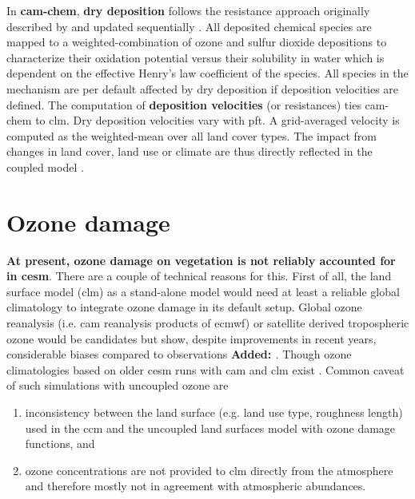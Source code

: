 In \textbf{\gls{cam}-chem}, \textbf{dry deposition} follows the resistance approach originally described by \textcites{AE:Wesely1989}{AE:Walcek1986} and updated sequentially \parencites{AE:Walmsley1996}{AE:Wesely2000}. All deposited chemical species are mapped to a weighted-combination of ozone and sulfur dioxide depositions to characterize their oxidation potential versus their solubility in water which is dependent on the effective Henry’s law coefficient of the species. All species in the mechanism are per default affected by dry deposition if deposition velocities are defined. The computation of \textbf{deposition velocities} (or resistances) ties \gls{cam}-chem to \gls{clm}. Dry deposition velocities vary with \gls{pft}. A grid-averaged velocity is computed as the weighted-mean over all land cover types. The impact from changes in land cover, land use or climate are thus directly reflected in the coupled model \parencite{GMD:Lamarque2012}. 

\section{Ozone damage}
\label{sec:ozone_damage}
\textbf{At present, ozone damage on vegetation is not reliably accounted for in \gls{cesm}}. There are a couple of technical reasons for this. First of all, the land surface model (\gls{clm}) as a stand-alone model would need at least a reliable global climatology to integrate ozone damage in its default setup. Global ozone reanalysis (i.e. \gls{cam} reanalysis products of \gls{ecmwf}) or satellite derived tropospheric ozone would be candidates but show, despite improvements in recent years, considerable biases compared to observations \textbf{\color{blue}Added: \parencites{GMD:Huijnen2020}{ACPD:Barten2020}}. Though ozone climatologies based on older \gls{cesm} runs with \gls{cam} and \gls{clm} exist \parencite{ACP:Lamarque2010}. Common caveat of such simulations with uncoupled ozone are
\begin{enumerate}
\itemsep0pt
\item inconsistency between the land surface (e.g. land use type, roughness length) used in the \gls{ccm} and the uncoupled land surfaces model with ozone damage functions, and
\item ozone concentrations are not provided to \gls{clm} directly from the atmosphere and therefore mostly not in agreement with atmospheric abundances.
\end{enumerate}


